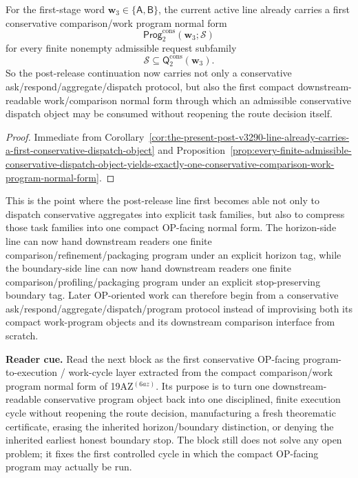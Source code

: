 \begin{corollary}
\label{cor:the-present-post-v3290-line-already-carries-a-first-conservative-comparison-work-program-normal-form}
For the first-stage word \(\mathbf w_3\in\{\mathsf A,\mathsf B\}\), the current active line already carries a first conservative comparison/work program normal form
\[
  \mathsf{Prog}^{\mathrm{cons}}_{2}(\mathbf w_3;\mathcal S)
\]
for every finite nonempty admissible request subfamily
\[
  \mathcal S\subseteq \mathsf{Q}^{\mathrm{cons}}_{2}(\mathbf w_3).
\]
So the post-release continuation now carries not only a conservative ask/respond/aggregate/dispatch protocol, but also the first compact downstream-readable work/comparison normal form through which an admissible conservative dispatch object may be consumed without reopening the route decision itself.
\end{corollary}

\begin{proof}
Immediate from Corollary~\ref{cor:the-present-post-v3290-line-already-carries-a-first-conservative-dispatch-object} and Proposition~\ref{prop:every-finite-admissible-conservative-dispatch-object-yields-exactly-one-conservative-comparison-work-program-normal-form}.
\end{proof}

\begin{remark}
\label{rem:what-the-first-conservative-comparison-work-program-normal-form-now-buys}
This is the point where the post-release line first becomes able not only to dispatch conservative aggregates into explicit task families, but also to compress those task families into one compact OP-facing normal form. The horizon-side line can now hand downstream readers one finite comparison/refinement/packaging program under an explicit horizon tag, while the boundary-side line can now hand downstream readers one finite comparison/profiling/packaging program under an explicit stop-preserving boundary tag. Later OP-oriented work can therefore begin from a conservative ask/respond/aggregate/dispatch/program protocol instead of improvising both its compact work-program objects and its downstream comparison interface from scratch.
\end{remark}


\noindent\textbf{Reader cue.} Read the next block as the first conservative OP-facing program-to-execution / work-cycle layer extracted from the compact comparison/work program normal form of 19AZ$^{(6az)}$. Its purpose is to turn one downstream-readable conservative program object back into one disciplined, finite execution cycle without reopening the route decision, manufacturing a fresh theorematic certificate, erasing the inherited horizon/boundary distinction, or denying the inherited earliest honest boundary stop. The block still does not solve any open problem; it fixes the first controlled cycle in which the compact OP-facing program may actually be run.

